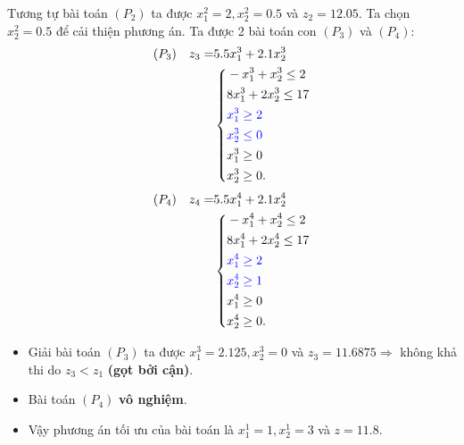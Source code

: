 \documentclass[12pt,a4paper]{report}
\begin{document}
    Tương tự bài toán $(P_2)$ ta được $x^2_1 = 2, x^2_2 = 0.5$ và $z_2=12.05$. Ta chọn $x^2_2 = 0.5$ để cải thiện phương án. Ta được 2 bài toán con $(P_3)$ và $(P_4)$:
    \begin{equation*}
        \begin{split}
            (P_3) \quad z_3= & 5.5x^3_1 + 2.1x^3_2 \\
            & \left\{\begin{split}
            & -x^3_1 + x^3_2 \leq 2 \\
            & 8x^3_1 + 2x^3_2 \leq 17 \\
            & \color{blue} x^3_1 \geq 2 \\
            & \color{blue} x^3_2 \leq 0 \\
            &x^3_1 \geq 0 \\
            &x^3_2 \geq 0. \\
            \end{split}\right. \\
        \end{split}
    \end{equation*}
   \begin{equation*}
        \begin{split}
            (P_4) \quad z_4= & 5.5x^4_1 + 2.1x^4_2  \\
            & \left\{\begin{split}
            & -x^4_1 + x^4_2 \leq 2 \\
            & 8x^4_1 + 2x^4_2 \leq 17 \\
            & \color{blue} x^4_1 \geq 2 \\
            & \color{blue} x^4_2 \geq 1 \\
            &x^4_1 \geq 0 \\
            &x^4_2 \geq 0. \\
            \end{split}\right. \\
        \end{split}
    \end{equation*}



    \begin{itemize} 
    \item Giải bài toán $(P_3)$ ta được $x^3_1=2.125, x^3_2=0$ và $z_3=11.6875 \Rightarrow $ không khả thi do $z_3 < z_1$ \textbf{(gọt bởi cận)}. 
    \item Bài toán $(P_4)$ \textbf{vô nghiệm}.
    \item Vậy phương án tối ưu của bài toán là $x^1_1=1, x^1_2=3$ và $z=11.8$.
\end{itemize}
\end{document}

